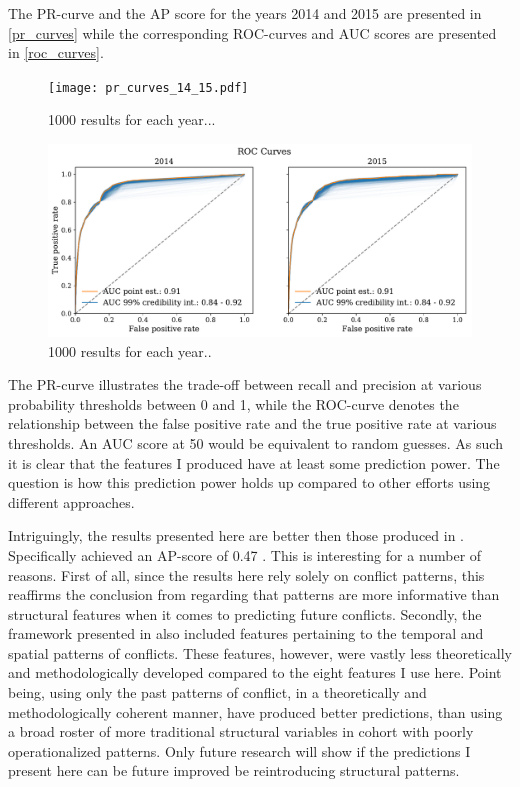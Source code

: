 \documentclass[a4paper]{article}
\begin{document}
The PR-curve and the AP score for the years 2014 and 2015 are presented in \autoref{pr_curves} while the corresponding ROC-curves and AUC scores are presented in \autoref{roc_curves}.\par 

\begin{figure}[!htb]
	\centering
	\texttt{[image: pr\_curves\_14\_15.pdf]}
    \caption{\footnotesize{1000 results for each year...}}\label{pr_curves}
\end{figure}

\begin{figure}[!htb]
	\centering
	\includegraphics[scale=0.47]{roc_curves_14_15.pdf}
    \caption{\footnotesize{1000 results for each year..}}\label{roc_curves}
\end{figure}

The PR-curve illustrates the trade-off between recall and precision at various probability thresholds between 0 and 1, while the ROC-curve denotes the relationship between the false positive rate and the true positive rate at various thresholds. An AUC score at 50 would be equivalent to random guesses. As such it is clear that the features I produced have at least some prediction power. The question is how this prediction power holds up compared to other efforts using different approaches.\par

Intriguingly, the results presented here are better then those produced in \cite{Maase}. Specifically \cite{Maase} achieved an AP-score of 0.47 \cite[14]{Maase}. This is interesting for a number of reasons. First of all, since the results here rely solely on conflict patterns, this reaffirms the conclusion from \cite{Maase} regarding that patterns are more informative than structural features when it comes to predicting future conflicts. Secondly, the framework presented in \cite{Maase} also included features pertaining to the temporal and spatial patterns of conflicts. These features, however, were vastly less theoretically and methodologically developed compared to the eight features I use here. Point being, using only the past patterns of conflict, in a theoretically and methodologically coherent manner, have produced better predictions, than using a broad roster of more traditional structural variables in cohort with poorly operationalized patterns. Only future research will show if the predictions I present here can be future improved be reintroducing structural patterns.\par
\end{document}

